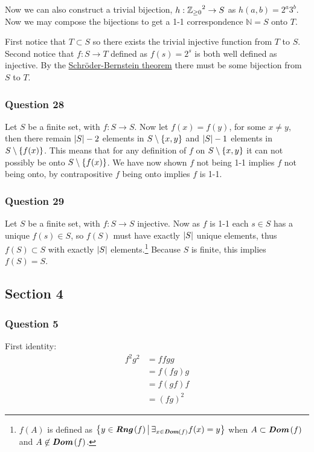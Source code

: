 \documentclass{article}
\begin{document}
Now we can also construct a trivial bijection, $h:{\mathbb Z_{\ge 0}}^2\to S$ as $h(a,b) = 2^a3^b$. Now we may compose the bijections to get a 1-1 correspondence $\mathbb N = S$ onto $T$.

\bigskip

First notice that $T \subset S$ so there exists the trivial injective function from $T$ to $S$. Second notice that $f:S\to T$ defined as $f(s)=2^s$ is both well defined as injective. By the  \href{https://en.wikipedia.org/wiki/Schr\%C3\%B6der\%E2\%80\%93Bernstein_theorem}{Schr\"oder-Bernstein theorem} there must be some bijection from $S$ to $T$.

\subsubsection{Question 28}

Let $S$ be a finite set, with $f:S\to S$. Now let $f(x) = f(y)$, for some $x\not=y$, then there remain $\left| {S} \right| - 2$ elements in $S\setminus\left\{ {x,y} \right\}$ and $\left| {S} \right| - 1$ elements in $S\setminus\left\{ {f(x)} \right\}$. This means that for any definition of $f$ on $S\setminus\left\{ {x,y} \right\}$ it can not possibly be onto $S\setminus\left\{ {f(x)} \right\}$. We have now shown $f$ not being 1-1 implies $f$ not being onto, by contrapositive $f$ being onto implies $f$ is 1-1.

\subsubsection{Question 29}

Let $S$ be a finite set, with $f:S\to S$ injective. Now as $f$ is 1-1 each $s\in S$ has a unique $f(s)\in S$, so $f(S)$ must have exactly $\left| {S} \right|$ unique elements, thus $f(S) \subset S$ with exactly $\left| {S} \right|$ elements.\footnote{$f(A)$ is defined as $\left\{{y\in\textit{\textbf{Rng}}\left( {f} \right)} \,\middle|\, {\exists_{x\in \textit{\textbf{Dom}}\left( {f} \right)} {f(x) = y} }\right\}$ when $A \subset \textit{\textbf{Dom}}\left( {f} \right)$ and $A\not\in\textit{\textbf{Dom}}\left( {f} \right)$.} Because $S$ is finite, this implies $f(S) = S$.

\subsection{Section 4}

\subsubsection{Question 5}

 First identity:
\begin{align*}
f^2g^2&=ffgg\\
&=f(fg)g\\
&=f(gf)f\\
&=(fg)^2
\end{align*}
\end{document}
